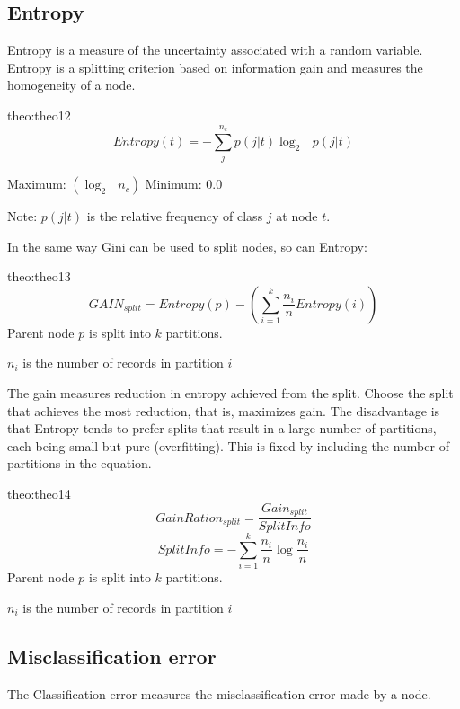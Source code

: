 \subsection{Entropy}
Entropy is a measure of the uncertainty associated with a random variable. Entropy is a splitting criterion based on information gain and measures the homogeneity of a node.

\bigskip
\begin{theo}[Entropy]{theo:theo12}
    \label{eq:entropy}
        \[
           Entropy(t) = -\sum_j^{n_c} p(j|t)\log_2 \text{ } p(j|t)
        \]
        \begin{center}
            Maximum: $(\log_2 \text{ } n_c)$ \qquad\qquad Minimum: $0.0$
        \end{center}
        Note: $p(j|t)$ is the relative frequency of class $j$ at node $t$.
\end{theo}

In the same way Gini can be used to split nodes, so can Entropy:

\bigskip
\begin{theo}{theo:theo13}
    \label{eq:entropysplit}
        \[
            GAIN_{split} = Entropy(p) - \left(\sum_{i=1}^k \frac{n_i}{n} Entropy(i)\right)
        \]
        Parent node $p$ is split into $k$ partitions.

        $n_i$ is the number of records in partition $i$
\end{theo}

The gain measures reduction in entropy achieved from the split. Choose the split that achieves the most reduction, that is, maximizes gain.
The disadvantage is that Entropy tends to prefer splits that result in a large number of partitions, each being small but pure (overfitting).
This is fixed by including the number of partitions in the equation.

\bigskip
\begin{theo}{theo:theo14}
    \label{eq:entropysplitratio}
        \[
            GainRation_{split} = \frac{Gain_{split}}{SplitInfo}
        \]
        \[
            SplitInfo = -\sum_{i=1}^k \frac{n_i}{n} \log\frac{n_i}{n}
        \]
        Parent node $p$ is split into $k$ partitions.

        $n_i$ is the number of records in partition $i$
\end{theo}

\subsection{Misclassification error}
The Classification error measures the misclassification error made by a node.

